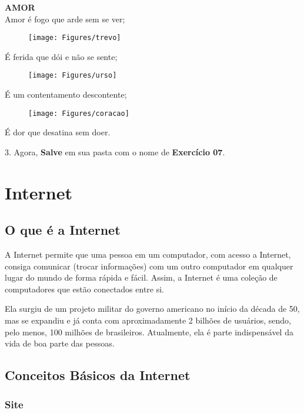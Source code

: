 \documentclass[hidelinks,12pt]{article}
\begin{document}
{\centering \textbf{AMOR}\\

Amor é fogo que arde sem se ver;
\begin{figure}[!h]
	\centering
	\texttt{[image: Figures/trevo]}
\end{figure}

É ferida que dói e não se sente;
\begin{figure}[!h]
	\centering
	\texttt{[image: Figures/urso]}
\end{figure}

É um contentamento descontente;

\begin{figure}[!h]
	\centering
	\texttt{[image: Figures/coracao]}
\end{figure}
É dor que desatina sem doer.

}
\bigskip

3. Agora, \textbf{Salve} em sua pasta com o nome de \textbf{Exercício 07}.

\section{Internet}

\subsection{O que é a Internet}

A Internet permite que uma pessoa em um computador, com acesso a Internet, consiga comunicar (trocar informações) com um outro computador em qualquer lugar do mundo de forma rápida e fácil. Assim, a Internet é uma coleção de computadores que estão conectados entre si.

Ela surgiu de um projeto militar do governo americano no início da década de 50, mas se expandiu e já conta com aproximadamente 2 bilhões de usuários, sendo, pelo menos, 100 milhões de brasileiros. Atualmente, ela é parte indispensável da vida de boa parte das pessoas.


\subsection{Conceitos Básicos da Internet}


\subsubsection{Site}
\end{document}
